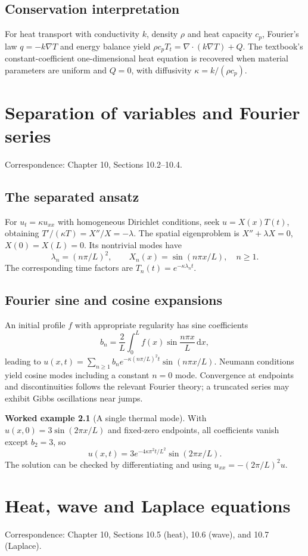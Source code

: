 \documentclass[11pt,letterpaper,oneside]{report}
\theoremstyle{definition}\newtheorem{definition}[theorem]{Definition}
\newtheorem{example}[theorem]{Worked example}
\theoremstyle{remark}\newtheorem{remark}[theorem]{Remark}
\newcommand{\dd}{\,\mathrm{d}}
\begin{document}
\section{Conservation interpretation}
For heat transport with conductivity $k$, density $\rho$ and heat capacity $c_p$, Fourier's law $q=-k\nabla T$ and energy balance yield $\rho c_p T_t=\nabla\cdot(k\nabla T)+Q$. The textbook's constant-coefficient one-dimensional heat equation is recovered when material parameters are uniform and $Q=0$, with diffusivity $\kappa=k/(\rho c_p)$.
\chapter{Separation of variables and Fourier series}
\begin{bookground}Correspondence: Chapter 10, Sections 10.2--10.4.\end{bookground}
\section{The separated ansatz}
For $u_t=\kappa u_{xx}$ with homogeneous Dirichlet conditions, seek $u=X(x)T(t)$, obtaining $T'/(\kappa T)=X''/X=-\lambda$. The spatial eigenproblem is $X''+\lambda X=0$, $X(0)=X(L)=0$. Its nontrivial modes have
\[\lambda_n=(n\pi/L)^2,\qquad X_n(x)=\sin(n\pi x/L),\quad n\ge1.\]
The corresponding time factors are $T_n(t)=e^{-\kappa\lambda_n t}$.
\section{Fourier sine and cosine expansions}
An initial profile $f$ with appropriate regularity has sine coefficients
\[b_n=\frac2L\int_0^L f(x)\sin\frac{n\pi x}{L}\dd x,\]
leading to $u(x,t)=\sum_{n\ge1}b_n e^{-\kappa(n\pi/L)^2t}\sin(n\pi x/L)$. Neumann conditions yield cosine modes including a constant $n=0$ mode. Convergence at endpoints and discontinuities follows the relevant Fourier theory; a truncated series may exhibit Gibbs oscillations near jumps.
\begin{example}[A single thermal mode]
With $u(x,0)=3\sin(2\pi x/L)$ and fixed-zero endpoints, all coefficients vanish except $b_2=3$, so
\[u(x,t)=3e^{-4\kappa\pi^2t/L^2}\sin(2\pi x/L).\]
The solution can be checked by differentiating and using $u_{xx}=-(2\pi/L)^2u$.
\end{example}
\chapter{Heat, wave and Laplace equations}
\begin{bookground}Correspondence: Chapter 10, Sections 10.5 (heat), 10.6 (wave), and 10.7 (Laplace).\end{bookground}
\end{document}
